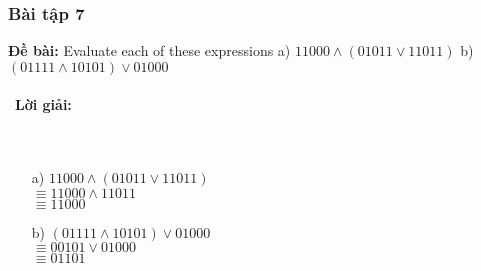 \documentclass[a4paper]{article}
\begin{document}
\subsubsection{Bài tập 7}
\textbf{Đề bài:} Evaluate each of these expressions
a) $11000 \land (01011 \lor 11011)$
b) $(01111 \land 10101) \lor 01000$
\\\ \\\
\textbf{Lời giải:} \\\ \\\
\begin{enumerate}
	\item [a)]
	$11000 \land (01011 \lor 11011)$\\$\equiv11000 \land 11011$\\$\equiv11000$
	\item [b)]
	$(01111 \land 10101) \lor 01000$\\$\equiv 00101 \lor 01000$\\ $\equiv 01101$\\
\end{enumerate}
\clearpage
\end{document}
